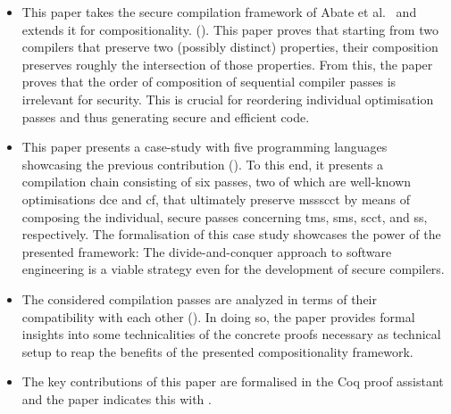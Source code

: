\documentclass[dvipsnames,conference]{IEEEtran}
\theoremstyle{definition}
\begin{document}
\begin{itemize}
  \item %
        This paper takes the secure compilation framework of Abate et al.~\cite{abate2021extacc} and extends it for compositionality. ().
        This paper proves that starting from two compilers that preserve two (possibly distinct) properties, their composition preserves roughly the intersection of those properties.
        From this, the paper proves that the order of composition of sequential compiler passes is irrelevant for security.
        This is crucial for reordering individual optimisation passes and thus generating secure and efficient code.

  \item %
        This paper presents a case-study with five programming languages showcasing the previous contribution ().
        To this end, it presents a compilation chain consisting of six passes, two of which are well-known optimisations \gls*{dce} and \gls*{cf}, that ultimately preserve \gls*{mssscct} by means of composing the individual, secure passes concerning \gls*{tms}, \gls*{sms}, \gls*{scct}, and \gls*{ss}, respectively.
        The formalisation of this case study showcases the power of the presented framework: The divide-and-conquer approach to software engineering is a viable strategy even for the development of secure compilers.

  \item %
        The considered compilation passes are analyzed in terms of their compatibility with each other ().
        In doing so, the paper provides formal insights into some technicalities of the concrete proofs necessary as technical setup to reap the benefits of the presented compositionality framework.

  \item The key contributions of this paper are formalised in the Coq proof assistant and the paper indicates this with \CoqSymbol.
\end{itemize}
\end{document}
